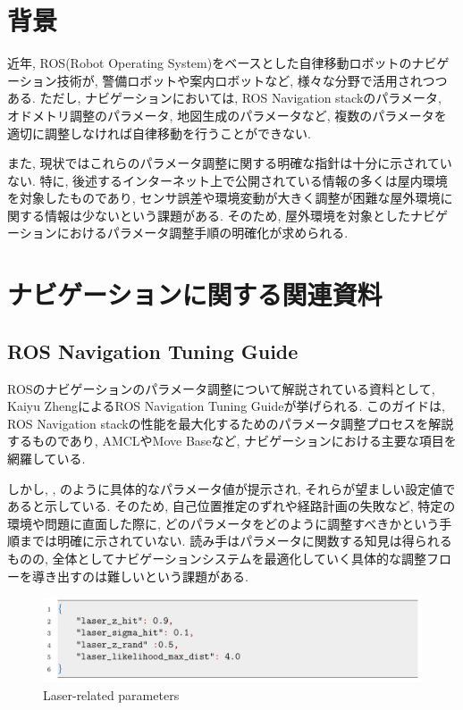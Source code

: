 
\section{背景}
近年, ROS(Robot Operating System)をベースとした自律移動ロボットのナビゲーション技術が, 警備ロボットや案内ロボットなど, 様々な分野で活用されつつある.\cite{haikei_1}\cite{siryo_4}
ただし, ナビゲーションにおいては, ROS Navigation stack\cite{navstack}のパラメータ, オドメトリ調整のパラメータ, 地図生成のパラメータなど, 複数のパラメータを
適切に調整しなければ自律移動を行うことができない. 

また, 現状ではこれらのパラメータ調整に関する明確な指針は十分に示されていない. 
特に, 後述するインターネット上で公開されている情報の多くは屋内環境を対象したものであり, 
センサ誤差や環境変動が大きく調整が困難な屋外環境に関する情報は少ないという課題がある. 
そのため, 屋外環境を対象としたナビゲーションにおけるパラメータ調整手順の明確化が求められる. 
\newpage
\section{ナビゲーションに関する関連資料}
\subsection{ROS Navigation Tuning Guide}
ROSのナビゲーションのパラメータ調整について解説されている資料として, Kaiyu ZhengによるROS Navigation Tuning Guide\cite{zheng2017rosnavigation}が挙げられる. 
このガイドは, ROS Navigation stackの性能を最大化するためのパラメータ調整プロセスを解説するものであり, AMCLやMove Baseなど, ナビゲーションにおける主要な項目を網羅している. 

しかし, , のように具体的なパラメータ値が提示され, それらが望ましい設定値であると示している. 
そのため, 自己位置推定のずれや経路計画の失敗など, 特定の環境や問題に直面した際に, どのパラメータをどのように調整すべきかという手順までは明確に示されていない. 
読み手はパラメータに関数する知見は得られるものの, 全体としてナビゲーションシステムを最適化していく具体的な調整フローを導き出すのは難しいという課題がある. 
\begin{figure}[hbtp]
  \centering
 \includegraphics[keepaspectratio, scale=0.3]
      {images/senkou_1.png}
 \caption{Laser-related parameters}
 \label{Fig:laser-related parameters}
\end{figure}

